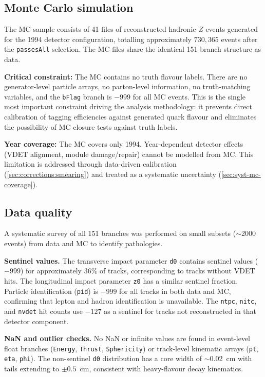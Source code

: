 \documentclass[11pt,a4paper]{article}
\begin{document}
\subsection{Monte Carlo simulation}
\label{sec:data:mc}

The MC sample consists of 41 files of reconstructed hadronic $Z$
events generated for the 1994 detector configuration, totalling
approximately $730{,}365$ events after the \texttt{passesAll}
selection.
The MC files share the identical 151-branch structure as data.

\textbf{Critical constraint:} The MC contains no truth flavour
labels.
There are no generator-level particle arrays, no parton-level
information, no truth-matching variables, and the \texttt{bFlag}
branch is $-999$ for all MC events.
This is the single most important constraint driving the analysis
methodology: it prevents direct calibration of tagging efficiencies
against generated quark flavour and eliminates the possibility of
MC closure tests against truth labels.

\textbf{Year coverage:} The MC covers only 1994.
Year-dependent detector effects (VDET alignment, module
damage/repair) cannot be modelled from MC.
This limitation is addressed through data-driven calibration
(\cref{sec:corrections:smearing}) and treated as a systematic
uncertainty (\cref{sec:syst-mc-coverage}).

\subsection{Data quality}
\label{sec:data:quality}

A systematic survey of all 151 branches was performed on small
subsets ($\sim$2000 events) from data and MC to identify
pathologies.

\textbf{Sentinel values.}
The transverse impact parameter \texttt{d0} contains sentinel
values ($-999$) for approximately 36\% of tracks, corresponding
to tracks without VDET hits.
The longitudinal impact parameter \texttt{z0} has a similar
sentinel fraction.
Particle identification (\texttt{pid}) is $-999$ for all tracks
in both data and MC, confirming that lepton and hadron
identification is unavailable.
The \texttt{ntpc}, \texttt{nitc}, and \texttt{nvdet} hit counts
use $-127$ as a sentinel for tracks not reconstructed in that
detector component.

\textbf{NaN and outlier checks.}
No NaN or infinite values are found in event-level float branches
(\texttt{Energy}, \texttt{Thrust}, \texttt{Sphericity}) or
track-level kinematic arrays (\texttt{pt}, \texttt{eta},
\texttt{phi}).
The non-sentinel \texttt{d0} distribution has a core width of
$\sim$0.02~cm with tails extending to $\pm 0.5$~cm, consistent
with heavy-flavour decay kinematics.
\end{document}
